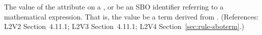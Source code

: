 The value of the  attribute on a \AlgebraicRule, \RateRule or
\AssignmentRule {} be an SBO identifier referring to a mathematical
expression.  That is, the value  be a term derived from
\sbomathformula.  (References: L2V2 Section~4.11.1;
L2V3 Section~4.11.1; L2V4 Section~\ref{sec:rule-sboterm}.)
